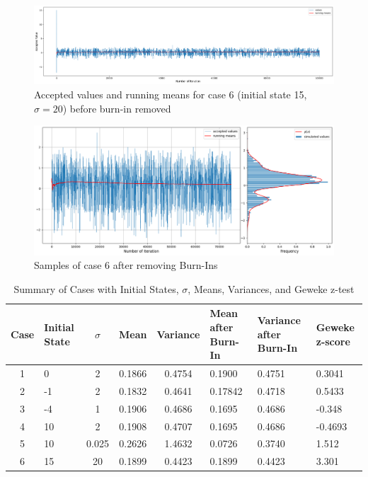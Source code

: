 \begin{example}
	\begin{figure}[H]
		\centering
		\includegraphics[width=1\textwidth]{./images/metropolis/example1/sample-6-values.png}
		\caption{Accepted values and running means for case 6 (initial state 15, $ \sigma = 20 $) before burn-in removed}
	\end{figure}

	\begin{figure}[H]
		\centering
		\includegraphics[width=1\textwidth]{./images/metropolis/example1/sample-6-value-hist-bo.png}
		\caption{Samples of case 6 after removing Burn-Ins}
	\end{figure}

	\begin{table}[ht]
		\centering
		\begin{tabular}{|c|p{2cm}|c|c|c|p{2cm}|p{2cm}|p{2cm}|}
			\hline
			Case & Initial State & $\sigma$ & Mean   & Variance & Mean after Burn-In & Variance after Burn-In & Geweke z-score \\ \hline
			1    & 0             & 2        & 0.1866 & 0.4754   & 0.1900             & 0.4751                 & 0.3041         \\ \hline
			2    & -1            & 2        & 0.1832 & 0.4641   & 0.17842            & 0.4718                 & 0.5433         \\ \hline
			3    & -4            & 1        & 0.1906 & 0.4686   & 0.1695             & 0.4686                 & -0.348         \\ \hline
			4    & 10            & 2        & 0.1908 & 0.4707   & 0.1695             & 0.4686                 & -0.4693        \\ \hline
			5    & 10            & 0.025    & 0.2626 & 1.4632   & 0.0726             & 0.3740                 & 1.512          \\ \hline
			6    & 15            & 20       & 0.1899 & 0.4423   & 0.1899             & 0.4423                 & 3.301          \\ \hline
		\end{tabular}
		\caption{Summary of Cases with Initial States, $\sigma$, Means, Variances, and Geweke z-test}
	\end{table}

\end{example}


